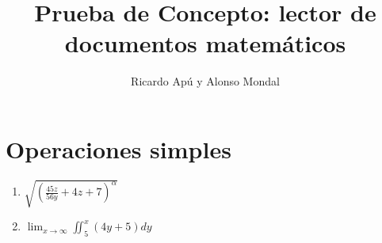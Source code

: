 \documentclass[11pt]{article}
\title{Prueba de Concepto: lector de documentos matemáticos}
\author{Ricardo Apú y Alonso Mondal}
\begin{document}
\maketitle
\section{Operaciones simples}
\begin{enumerate}
\item {$\sqrt{(\frac{45z}{56y} + 4z + 7)^{\alpha}}$}
\item {$\lim_{x \to \infty} \iint_{5}^{x} (4y+5) dy$}
\end{enumerate}
\end{document}
